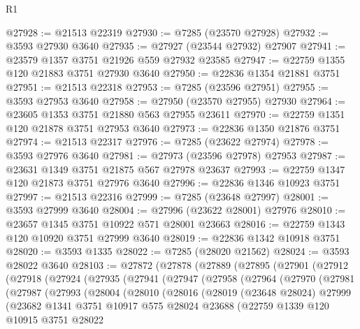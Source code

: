 \begin{lexlean}{R1}
\begin{coremodule}
@27928 := @21513 @22319
@27930 := @7285 (@23570 @27928)
@27932 := @3593 @27930 @3640
@27935 := @27927 (@23544 @27932) @27907
@27941 := @23579 @1357 @3751 @21926 @559 @27932 @23585
@27947 := @22759 @1355 @120 @21883 @3751 @27930 @3640
@27950 := @22836 @1354 @21881 @3751
@27951 := @21513 @22318
@27953 := @7285 (@23596 @27951)
@27955 := @3593 @27953 @3640
@27958 := @27950 (@23570 @27955) @27930
@27964 := @23605 @1353 @3751 @21880 @563 @27955 @23611
@27970 := @22759 @1351 @120 @21878 @3751 @27953 @3640
@27973 := @22836 @1350 @21876 @3751
@27974 := @21513 @22317
@27976 := @7285 (@23622 @27974)
@27978 := @3593 @27976 @3640
@27981 := @27973 (@23596 @27978) @27953
@27987 := @23631 @1349 @3751 @21875 @567 @27978 @23637
@27993 := @22759 @1347 @120 @21873 @3751 @27976 @3640
@27996 := @22836 @1346 @10923 @3751
@27997 := @21513 @22316
@27999 := @7285 (@23648 @27997)
@28001 := @3593 @27999 @3640
@28004 := @27996 (@23622 @28001) @27976
@28010 := @23657 @1345 @3751 @10922 @571 @28001 @23663
@28016 := @22759 @1343 @120 @10920 @3751 @27999 @3640
@28019 := @22836 @1342 @10918 @3751
@28020 := @3593 @1335
@28022 := @7285 (@28020 @21562)
@28024 := @3593 @28022 @3640
@28103 := @27872
    (@27878
      (@27889
        (@27895
          (@27901
            (@27912
              (@27918
                (@27924
                  (@27935
                    (@27941
                      (@27947
                        (@27958
                          (@27964
                            (@27970
                              (@27981
                                (@27987
                                  (@27993
                                    (@28004
                                      (@28010
                                        (@28016
                                          (@28019
                                            (@23648 @28024)
                                            @27999
                                            (@23682
                                              @1341
                                              @3751
                                              @10917
                                              @575
                                              @28024
                                              @23688
                                              (@22759
                                                @1339
                                                @120
                                                @10915
                                                @3751
                                                @28022

\end{coremodule}
\end{lexlean}
